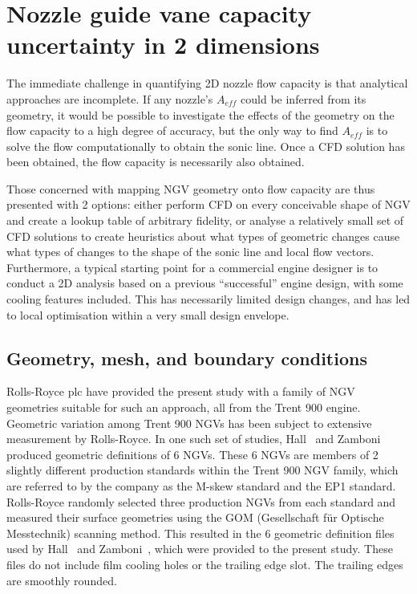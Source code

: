 \documentclass[a4paper, 11pt, oneside]{report}
\begin{document}
\section{Nozzle guide vane capacity uncertainty in 2 dimensions}
\label{section_1d_vs_2d_capacity_uncertainty}

The immediate challenge in quantifying 2D nozzle flow capacity is that analytical approaches are incomplete. If any nozzle's $A_{eff}$ could be inferred from its geometry, it would be possible to investigate the effects of the geometry on the flow capacity to a high degree of accuracy, but the only way to find $A_{eff}$ is to solve the flow computationally to obtain the sonic line. Once a CFD solution has been obtained, the flow capacity is necessarily also obtained. 

Those concerned with mapping NGV geometry onto flow capacity are thus presented with 2 options: either perform CFD on every conceivable shape of NGV and create a lookup table of arbitrary fidelity, or analyse a relatively small set of CFD solutions to create heuristics about what types of geometric changes cause what types of changes to the shape of the sonic line and local flow vectors. Furthermore, a typical starting point for a commercial engine designer is to conduct a 2D analysis based on a previous ``successful'' engine design, with some cooling features included. This has necessarily limited design changes, and has led to local optimisation within a very small design envelope.

\subsection{Geometry, mesh, and boundary conditions}

Rolls-Royce plc have provided the present study with a family of NGV geometries suitable for such an approach, all from the Trent 900 engine. Geometric variation among Trent 900 NGVs has been subject to extensive measurement by Rolls-Royce. In one such set of studies, Hall~\cite{hall_area} and Zamboni~\cite{zamboni_area} produced geometric definitions of 6 NGVs. These 6 NGVs are members of 2 slightly different production standards within the Trent 900 NGV family, which are referred to by the company as the M-skew standard and the EP1 standard. Rolls-Royce randomly selected three production NGVs from each standard and measured their surface geometries using the GOM (Gesellschaft f\"ur Optische Messtechnik) scanning method. This resulted in the 6 geometric definition files used by Hall~\cite{hall_area} and Zamboni~\cite{zamboni_area}, which were provided to the present study. These files do not include film cooling holes or the trailing edge slot. The trailing edges are smoothly rounded.
\end{document}
